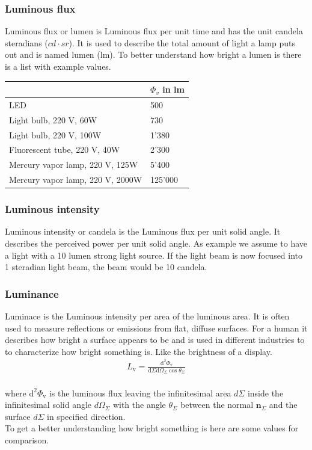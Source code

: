 \subsubsection{Luminous flux}
Luminous flux or lumen is Luminous flux per unit time and has the unit candela steradians ($cd\cdot sr$). It is used to describe the total amount of light a lamp puts out and is named lumen (lm). To better understand how bright a lumen is there is a list with example values. \\


\begin{tabular}{ |p{12cm} p{2cm}|  }
		\hline
		& $\Phi_v$ in lm\\
		
		
		\hline
		LED		& 500\\
		Light bulb, 220 V, 60W		& 730\\
		Light bulb, 220 V, 100W		& 1'380\\
		Fluorescent tube, 220 V, 40W		& 2'300\\
		Mercury vapor lamp, 220 V, 125W		& 5'400\\
		Mercury vapor lamp, 220 V, 2000W		& 125'000\\
		\hline
\end{tabular}



\subsubsection{Luminous intensity}
Luminous intensity or candela is the Luminous flux per unit solid angle. It describes the perceived power per unit solid angle. As example we assume to have a light with a 10 lumen strong light source. If the light beam is now focused into 1 steradian light beam, the beam would be 10 candela.\\

\subsubsection{Luminance}
Luminace is the Luminous intensity per area of the luminous area. It is often used to measure reflections or emissions from flat, diffuse surfaces. For a human it describes how bright a surface appears to be and is used in different industries to to characterize how bright something is. Like the brightness of a display. 
\begin{align*}
L_{\mathrm{v}}=\frac{\mathrm{d}^{2} \Phi_{\mathrm{v}}}{\mathrm{d} \Sigma \mathrm{d} \Omega_{\Sigma} \cos \theta_{\Sigma}}
\end{align*}\\
where $\mathrm{d}^{2} \Phi_{\mathrm{v}}$ is the luminous flux leaving the infinitesimal area $d\Sigma$ inside the infinitesimal solid angle $d\Omega_\Sigma$ with the angle $\theta_{\Sigma}$ between the normal $\mathbf{n}_{\Sigma}$ and the surface $d\Sigma$ in specified direction. \\
To get a better understanding how bright something is here are some values for comparison.\\



